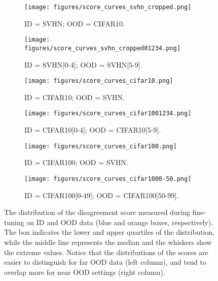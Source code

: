 \begin{figure*}[t]
  \centering

  \begin{subfigure}[r]{0.49\textwidth}
    \centering
    \texttt{[image: figures/score\_curves\_svhn\_cropped.png]}
    \caption{ID = SVHN; OOD = CIFAR10.}
  \end{subfigure}
  \hfill
  \begin{subfigure}[r]{0.49\textwidth}
    \centering
    \texttt{[image: figures/score\_curves\_svhn\_cropped01234.png]}
    \caption{ID = SVHN[0-4]; OOD = SVHN[5-9].}
  \end{subfigure}

  \begin{subfigure}[r]{0.49\textwidth}
    \centering
    \texttt{[image: figures/score\_curves\_cifar10.png]}
    \caption{ID = CIFAR10; OOD = SVHN.}
  \end{subfigure}
  \hfill
  \begin{subfigure}[r]{0.49\textwidth}
    \centering
    \texttt{[image: figures/score\_curves\_cifar1001234.png]}
    \caption{ID = CIFAR10[0-4]; OOD = CIFAR10[5-9].}
  \end{subfigure}

  \begin{subfigure}[r]{0.49\textwidth}
    \centering
    \texttt{[image: figures/score\_curves\_cifar100.png]}
    \caption{ID = CIFAR100; OOD = SVHN.}
  \end{subfigure}
  \hfill
  \begin{subfigure}[r]{0.49\textwidth}
    \centering
    \texttt{[image: figures/score\_curves\_cifar1000-50.png]}
    \caption{ID = CIFAR100[0-49]; OOD = CIFAR100[50-99].}
  \end{subfigure}

  \caption{ \small{The distribution of the disagreement score measured during
  fine-tuning on ID and OOD data (blue and orange boxes, respectively). The box
  indicates the lower and upper quartiles of the distribution, while the
  middle line represents the median and the whiskers show the extreme values.
  Notice that the distributions of the scores are easier to distinguish for far
  OOD data (left column), and tend to overlap more for near OOD settings (right
  column).}}

  \label{fig:appendix_score_curves}
\end{figure*}



















